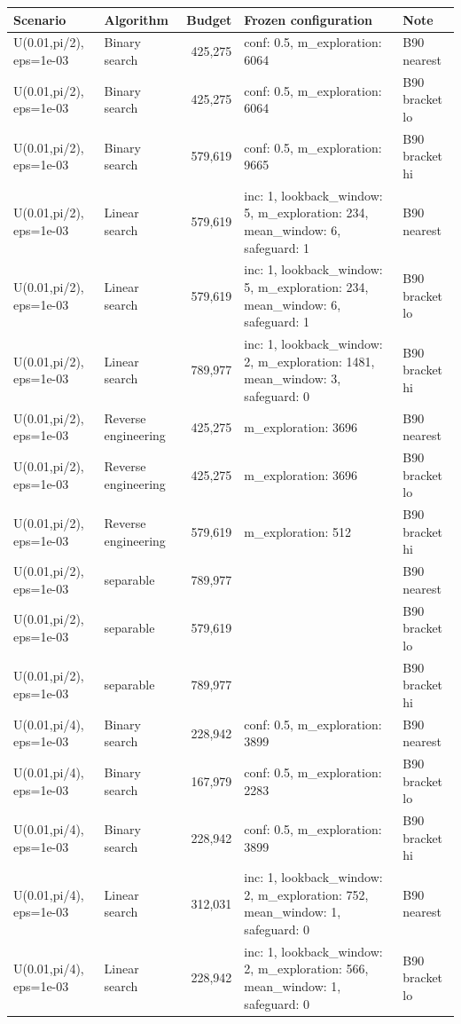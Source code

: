 \begin{tabular}{llrll}
\toprule
Scenario & Algorithm & Budget & Frozen configuration & Note \\
\midrule
U(0.01,pi/2), eps=1e-03 & Binary search & 425,275 & conf: 0.5, m\_exploration: 6064 & B90 nearest \\
U(0.01,pi/2), eps=1e-03 & Binary search & 425,275 & conf: 0.5, m\_exploration: 6064 & B90 bracket lo \\
U(0.01,pi/2), eps=1e-03 & Binary search & 579,619 & conf: 0.5, m\_exploration: 9665 & B90 bracket hi \\
U(0.01,pi/2), eps=1e-03 & Linear search & 579,619 & inc: 1, lookback\_window: 5, m\_exploration: 234, mean\_window: 6, safeguard: 1 & B90 nearest \\
U(0.01,pi/2), eps=1e-03 & Linear search & 579,619 & inc: 1, lookback\_window: 5, m\_exploration: 234, mean\_window: 6, safeguard: 1 & B90 bracket lo \\
U(0.01,pi/2), eps=1e-03 & Linear search & 789,977 & inc: 1, lookback\_window: 2, m\_exploration: 1481, mean\_window: 3, safeguard: 0 & B90 bracket hi \\
U(0.01,pi/2), eps=1e-03 & Reverse engineering & 425,275 & m\_exploration: 3696 & B90 nearest \\
U(0.01,pi/2), eps=1e-03 & Reverse engineering & 425,275 & m\_exploration: 3696 & B90 bracket lo \\
U(0.01,pi/2), eps=1e-03 & Reverse engineering & 579,619 & m\_exploration: 512 & B90 bracket hi \\
U(0.01,pi/2), eps=1e-03 & separable & 789,977 &  & B90 nearest \\
U(0.01,pi/2), eps=1e-03 & separable & 579,619 &  & B90 bracket lo \\
U(0.01,pi/2), eps=1e-03 & separable & 789,977 &  & B90 bracket hi \\
U(0.01,pi/4), eps=1e-03 & Binary search & 228,942 & conf: 0.5, m\_exploration: 3899 & B90 nearest \\
U(0.01,pi/4), eps=1e-03 & Binary search & 167,979 & conf: 0.5, m\_exploration: 2283 & B90 bracket lo \\
U(0.01,pi/4), eps=1e-03 & Binary search & 228,942 & conf: 0.5, m\_exploration: 3899 & B90 bracket hi \\
U(0.01,pi/4), eps=1e-03 & Linear search & 312,031 & inc: 1, lookback\_window: 2, m\_exploration: 752, mean\_window: 1, safeguard: 0 & B90 nearest \\
U(0.01,pi/4), eps=1e-03 & Linear search & 228,942 & inc: 1, lookback\_window: 2, m\_exploration: 566, mean\_window: 1, safeguard: 0 & B90 bracket lo \\

\end{tabular}
